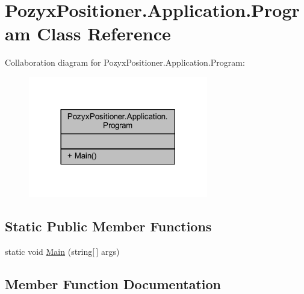 \hypertarget{class_pozyx_positioner_1_1_application_1_1_program}{}\section{Pozyx\+Positioner.\+Application.\+Program Class Reference}
\label{class_pozyx_positioner_1_1_application_1_1_program}


Collaboration diagram for Pozyx\+Positioner.\+Application.\+Program\+:
\nopagebreak
\begin{figure}[H]
\begin{center}
\leavevmode
\includegraphics[width=222pt]{class_pozyx_positioner_1_1_application_1_1_program__coll__graph}
\end{center}
\end{figure}
\subsection*{Static Public Member Functions}
\begin{DoxyCompactItemize}
\item 
static void \hyperlink{class_pozyx_positioner_1_1_application_1_1_program_a8f5cebbeb8f01e37365775321387282a}{Main} (string\mbox{[}$\,$\mbox{]} args)
\end{DoxyCompactItemize}


\subsection{Member Function Documentation}
\mbox{\label{class_pozyx_positioner_1_1_application_1_1_program_a8f5cebbeb8f01e37365775321387282a}} 
